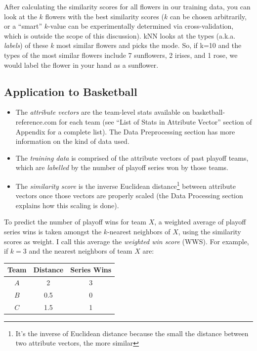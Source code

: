 \documentclass[a4paper,11pt]{article}
\begin{document}
After calculating the similarity scores for all flowers in our training data, you can look at the $k$ flowers with the best similarity scores ($k$ can be chosen arbitrarily, or a ``smart'' $k$-value can be experimentally determined via cross-validation, which is outside the scope of this discussion). kNN looks at the types (a.k.a. \emph{labels}) of these $k$ most similar flowers and picks the mode. So, if k=10 and the types of the most similar flowers include 7 sunflowers, 2 irises, and 1 rose, we would label the flower in your hand as a sunflower.

\subsection{Application to Basketball}
\begin{itemize}
\item The \emph{attribute vectors} are the team-level stats available on basketball-reference.com for each team (see ``List of Stats in Attribute Vector'' section of Appendix for a complete list). The Data Preprocessing section has more information on the kind of data used. 

\item The \emph{training data} is comprised of the attribute vectors of past playoff teams, which are \emph{labelled} by the number of playoff series won by those teams.
	
\item The \emph{similarity score} is the inverse Euclidean distance\footnote{It's the inverse of Euclidean distance because the small the distance between two attribute vectors, the more similar } between attribute vectors once those vectors are properly scaled (the Data Processing section explains how this scaling is done).
\end{itemize}

To predict the number of playoff wins for team $X$, a weighted average of playoff series wins is taken amongst the $k$-nearest neighbors of $X$, using the similarity scores as weight. I call this average the \emph{weighted win score} (WWS). For example, if $k=3$ and the nearest neighbors of team $X$ are:

\begin{center}
    \begin{tabular}{| c | c | c |}
    \hline
    Team & Distance & Series Wins \\ \hline
    $A$ & 2 & 3  \\ \hline
    $B$ & 0.5 & 0 \\ \hline
    $C$ & 1.5 & 1  \\
    \hline
    \end{tabular}
\end{center}
\end{document}
